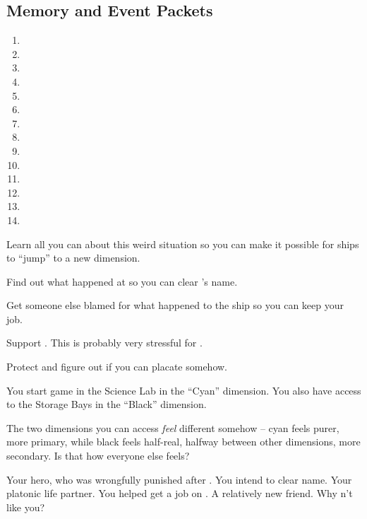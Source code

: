 \documentclass[char]{TMFHope}
\begin{document}
\subsection*{Memory and Event Packets}
\begin{enumerate}
	\item \mPractice{\MYname}
	\item \mNAlpha{\MYname}
	\item \mNavOne{\MYname}
	\item \mNavTwo{\MYname}
	\item \mNavThree{\MYname}
	\item \mNavFour{\MYname}
	\item \mNavFive{\MYname}
	\item \mBroom{\MYname}
	\item \mLab{\MYname}
	\item \mPatient{\MYname}
	\item \mKitchen{\MYname}
	\item \mWeight{\MYname}
	\item \mTheater{\MYname}
	\item \mCrates{\MYname}
\end{enumerate}

\begin{itemz}[Goals]
	\item Learn all you can about this weird situation so you can make it possible for ships to ``jump'' to a new dimension.
	\item Find out what happened at \pBattle{} so you can clear \cCap{}'s name.
	\item Get someone else blamed for what happened to the ship so you can keep your job.
	\item Support \cWeap{}. This is probably very stressful for \cWeap{\them}.
	\item Protect \cBoy{} and figure out if you can placate \cEng{} somehow.
\end{itemz}

\begin{itemz}[Notes]
	\item You start game in the Science Lab in the ``Cyan'' dimension. You also have access to the Storage Bays in the ``Black'' dimension.
	\item The two dimensions you can access {\em feel} different somehow -- cyan feels purer, more primary, while black feels half-real, halfway between other dimensions, more secondary.  Is that how everyone else feels?
\end{itemz}

\begin{contacts}
	\contact{\cCap{}} Your hero, who was wrongfully punished after \pBattle{}. You intend to clear \cCap{\their} name.
	\contact{\cBoy{}} Your platonic life partner. You helped get \cBoy{\them} a job on \pNew{}.
	\contact{\cWeap{}} A relatively new friend.
	\contact{\cEng{}} Why \cEng{\does}n't \cEng{\they} like you?
\end{contacts}
\end{document}
